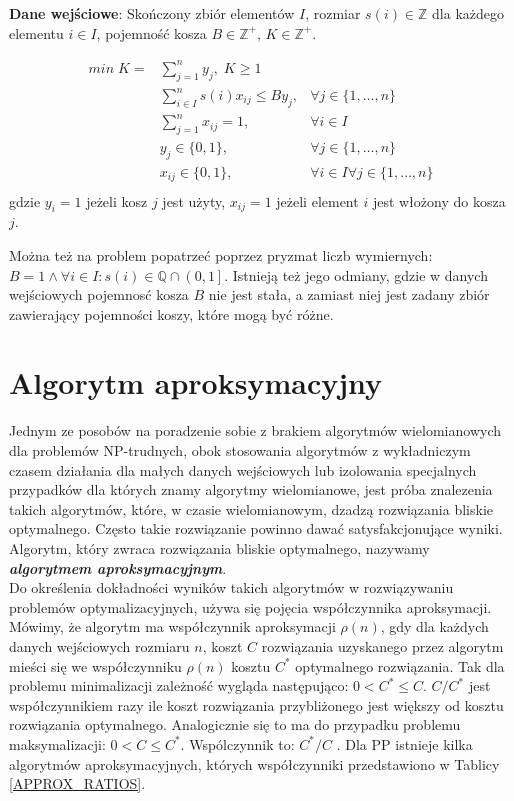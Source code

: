 \textbf{Dane wejściowe}: Skończony zbiór elementów $I$, rozmiar $s(i) \in \mathbb{Z}$ dla każdego elementu $i \in I$, pojemność kosza $B \in \mathbb{Z^+}$, $K \in \mathbb{Z^+}$.

\begin{align*}
	min \; K = &\sum_{j=1}^{n} y_{j}, \; K \geq 1 \\
	&\sum_{i \in I}^{n} s(i)x_{ij} \leq By_j, &\forall j \in \{1, \dots, n\} \\
    &\sum_{j=1}^{n} x_{ij} = 1, \; &\forall i \in I \\
	&y_j \in \{0,1\}, \; & \forall j \in \{1, \dots, n\} \\
	&x_{ij} \in \{0,1\}, \; & \forall i \in I \forall j \in \{1, \dots, n\} \\
\end{align*}
gdzie $y_i = 1$ jeżeli kosz $j$ jest użyty,  $x_{ij} = 1$ jeżeli element $i$ jest włożony do kosza $j$.
	
Można też na problem popatrzeć poprzez pryzmat liczb wymiernych:
$B = 1 \land \forall i \in I: s(i) \in \mathbb{Q} \cap \left(0, 1\right]$. Istnieją też jego odmiany, gdzie w danych wejściowych pojemnosć kosza $B$ nie jest stała, a zamiast niej jest zadany zbiór zawierający pojemności koszy, które mogą być różne.

\section{Algorytm aproksymacyjny}
Jednym ze posobów na poradzenie sobie z brakiem algorytmów wielomianowych dla problemów NP-trudnych, obok stosowania algorytmów z wykładniczym czasem działania dla małych danych wejściowych lub izolowania specjalnych przypadków dla których znamy algorytmy wielomianowe, jest próba znalezenia takich algorytmów, które, w czasie wielomianowym, dzadzą rozwiązania bliskie optymalnego. Często takie rozwiązanie powinno dawać satysfakcjonujące wyniki. Algorytm, który zwraca rozwiązania bliskie optymalnego, nazywamy \textbf{\textit{algorytmem aproksymacyjnym}}. \\
Do określenia dokładności wyników takich algorytmów w rozwiązywaniu problemów optymalizacyjnych, używa się pojęcia współczynnika aproksymacji. Mówimy, że algorytm ma współczynnik aproksymacji $\rho(n)$, gdy dla każdych danych wejściowych rozmiaru $n$, koszt $C$ rozwiązania uzyskanego przez algorytm mieści się we współczynniku $\rho(n)$ kosztu $C^*$ optymalnego rozwiązania. Tak dla problemu minimalizacji zależność wygląda następująco: $0< C^* \leq C$. $C/C^*$ jest współczynnikiem razy ile koszt rozwiązania przybliżonego jest większy od kosztu rozwiązania optymalnego. Analogicznie się to ma do przypadku problemu maksymalizacji: $0< C \leq C^*$. Wspólczynnik to: $C^*/C$  \cite[Rozdział~35]{Cormen_algos}.
\newpage
Dla PP istnieje kilka algorytmów aproksymacyjnych, których współczynniki przedstawiono w Tablicy \ref{APPROX_RATIOS}.

